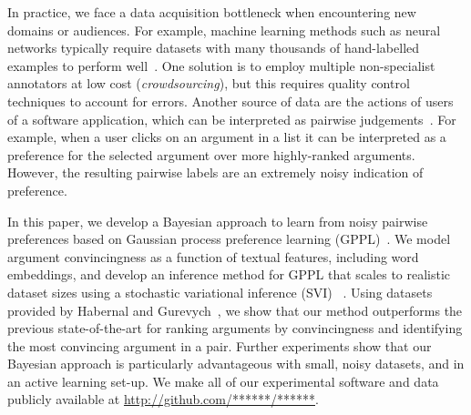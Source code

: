 In practice, we face a data acquisition bottleneck when encountering new domains or audiences.
For example, machine learning methods such as neural networks typically require datasets with 
many thousands of hand-labelled examples to perform well~\cite{srivastava2014dropout,collobert2011natural}.
One solution is to employ multiple non-specialist annotators at low cost (\emph{crowdsourcing}), 
but this requires quality control techniques to account for errors.
Another source of data are the actions of users of a software application, which can be interpreted as pairwise judgements~\cite{joachims2002optimizing}. For example, when a user clicks on an argument in a list it can be interpreted
 as a preference for the selected argument over more highly-ranked arguments.
However, the resulting pairwise labels are an extremely noisy indication of preference.

In this paper, we develop a Bayesian approach to learn from noisy pairwise preferences
based on Gaussian process preference learning (GPPL)~\cite{chu2005preference}.
We model argument convincingness as a function of textual features, including word embeddings,
and develop an inference method for GPPL that scales to realistic dataset sizes using a stochastic variational inference (SVI) ~\cite{hoffman2013stochastic}. %
Using datasets provided by Habernal and Gurevych~,
we show that our method outperforms the previous state-of-the-art for ranking arguments by convincingness 
and identifying the most convincing argument in a pair. 
Further experiments show that our Bayesian approach is particularly advantageous with small, noisy datasets, 
and in an active learning set-up.
We make all of our experimental software and data publicly available at \url{http://github.com/******/******}.


